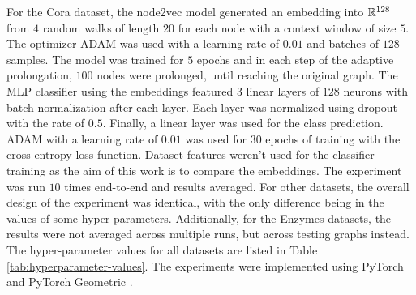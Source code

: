 For the Cora dataset, the node2vec model generated an embedding into \( \mathbb{R}^{128} \) from \( 4 \) random walks of length \( 20 \) for each node with a context window of size \( 5 \). The optimizer ADAM \cite{kingma_adam:_2017} was used with a learning rate of \( 0.01 \) and batches of \( 128 \) samples. The model was trained for \( 5 \) epochs and in each step of the adaptive prolongation, \( 100 \) nodes were prolonged, until reaching the original graph. The MLP classifier using the embeddings featured \( 3 \) linear layers of \( 128 \) neurons with batch normalization after each layer. Each layer was normalized using dropout \cite{srivastava_dropout_2014} with the rate of \( 0.5 \). Finally, a linear layer was used for the class prediction. ADAM with a learning rate of \( 0.01 \) was used for \( 30 \) epochs of training with the cross-entropy loss function. Dataset features weren't used for the classifier training as the aim of this work is to compare the embeddings. The experiment was run \( 10 \) times end-to-end and results averaged. For other datasets, the overall design of the experiment was identical, with the only difference being in the values of some hyper-parameters. Additionally, for the Enzymes datasets, the results were not averaged across multiple runs, but across testing graphs instead. The hyper-parameter values for all datasets are listed in Table \ref{tab:hyperparameter-values}. The experiments were implemented using PyTorch \cite{paszke_pytorch_2019} and PyTorch Geometric \cite{fey_fast_2019}.

